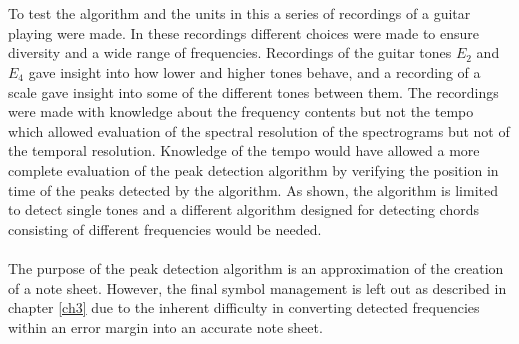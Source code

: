 \\\\
To test the algorithm and the units in this a series of recordings of a guitar playing were made. In these recordings different choices were made to ensure diversity and a wide range of frequencies. Recordings of the guitar tones $E_2$ and $E_4$ gave insight into how lower and higher tones behave, and a recording of a scale gave insight into some of the different tones between them. The recordings were made with knowledge about the frequency contents but not the tempo which allowed evaluation of the spectral resolution of the spectrograms but not of the temporal resolution. Knowledge of the tempo would have allowed a more complete evaluation of the peak detection algorithm by verifying the position in time of the peaks detected by the algorithm. As shown, the algorithm is limited to detect single tones and a different algorithm designed for detecting chords consisting of different frequencies would be needed.
\\\\
The purpose of the peak detection algorithm is an approximation of the creation of a note sheet. However, the final symbol management is left out as described in chapter \ref{ch3} due to the inherent difficulty in converting detected frequencies within an error margin into an accurate note sheet.